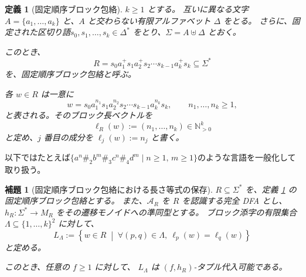 \documentclass[11pt,a4paper]{ltjsarticle}
\newtheorem{lemma}[theorem]{補題}
\newtheorem{definition}[theorem]{定義}
\theoremstyle{remark}
\begin{document}
\begin{definition}[固定順序ブロック包絡]
\label{def:fixed-ordered-block-envelope}
\(k\ge 1\) とする。
互いに異なる文字$  A=\{a_1,\ldots,a_k\}$
と、\(A\) と交わらない有限アルファベット \(\Delta\) をとる。
さらに、固定された区切り語$  s_0,s_1,\ldots,s_k\in\Delta^*$
をとり、$  \Sigma=A\uplus\Delta$
とおく。

このとき、
\[
  R
  =
  s_0a_1^+s_1a_2^+s_2\cdots s_{k-1}a_k^+s_k
  \subseteq\Sigma^*
\]
を、\emph{固定順序ブロック包絡}と呼ぶ。

各 \(w\in R\) は一意に
\[
  w
  =
  s_0a_1^{n_1}s_1a_2^{n_2}s_2
  \cdots
  s_{k-1}a_k^{n_k}s_k,
  \qquad
  n_1,\ldots,n_k\ge1,
\]
と表される。そのブロック長ベクトルを
\[
  \ell_R(w)
  :=
  (n_1,\ldots,n_k)
  \in\mathbb{N}_{>0}^k
\]
と定め、\(j\) 番目の成分を \(\ell_j(w):=n_j\) と書く。
\end{definition}

以下ではたとえば$  \{a^n\#_2b^m\#_3c^n\#_4d^m\mid n\ge1,\, m\ge1\}$のような言語を一般化して取り扱う。

\begin{lemma}[固定順序ブロック包絡における長さ等式の保存]
\label{lem:block-equality-envelopes}
\(R\subseteq\Sigma^*\) を、定義
\ref{def:fixed-ordered-block-envelope}
の固定順序ブロック包絡とする。
また、\(\mathcal A_R\) を \(R\) を認識する完全 DFA とし、$  h_R:\Sigma^*\longrightarrow M_R$
をその遷移モノイドへの準同型とする。
ブロック添字の有限集合$  \Lambda\subseteq\{1,\ldots,k\}^2$
に対して、
\[
  L_\Lambda
  :=
  \left\{
    w\in R
    \;\middle|\;
    \forall (p,q)\in\Lambda,\ 
    \ell_p(w)=\ell_q(w)
  \right\}
\]
と定める。

このとき、任意の \(f\ge1\) に対して、
\(L_\Lambda\) は \((f,h_R)\)-タプル代入可能である。
\end{lemma}
\end{document}
